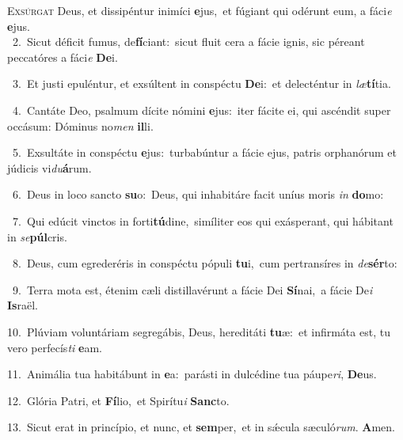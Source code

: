 \lettrine{\initial\textcolor{\initialcolor}{E}}{xsúrgat} Deus, et dissipéntur inimíci \textbf{e}\-jus,~\star et fúgiant qui odérunt eum, a fáci\textit{e} \textbf{e}\-jus.\\
{\numbfont\textcolor{\numbcolor}{~2.}}~Sicut déficit fumus, de\-\textbf{fí}\-ciant:~\star sicut fluit cera a fácie ignis, sic péreant peccatóres a fáci\textit{e} \textbf{De}\-i.\par
{\numbfont\textcolor{\numbcolor}{~3.}}~Et justi epuléntur, et exsúltent in conspéctu \textbf{De}\-i:~\star et delecténtur in \textit{læ}\-\textbf{tí}tia.\par
{\numbfont\textcolor{\numbcolor}{~4.}}~Cantáte Deo, psalmum dícite nómini \textbf{e}\-jus:~\star iter fácite ei, qui ascéndit super occásum: Dóminus no\textit{men} \textbf{il}\-li.\par
{\numbfont\textcolor{\numbcolor}{~5.}}~Exsultáte in conspéctu \textbf{e}\-jus:~\star turbabúntur a fácie ejus, patris orphanórum et júdicis vi\-\textit{du}\-\textbf{á}rum.\par
{\numbfont\textcolor{\numbcolor}{~6.}}~Deus in loco sancto \textbf{su}\-o:~\star Deus, qui inhabitáre facit uníus moris \textit{in} \textbf{do}\-mo:\par
{\numbfont\textcolor{\numbcolor}{~7.}}~Qui edúcit vinctos in forti\-\textbf{tú}\-dine,~\star simíliter eos qui exásperant, qui hábitant in \textit{se}\-\textbf{púl}cris.\par
{\numbfont\textcolor{\numbcolor}{~8.}}~Deus, cum egrederéris in conspéctu pópuli \textbf{tu}\-i,~\star cum pertransíres in \textit{de}\-\textbf{sér}to:\par
{\numbfont\textcolor{\numbcolor}{~9.}}~Terra mota est, étenim cæli distillavérunt a fácie Dei \textbf{Sí}\-nai,~\star a fácie De\textit{i} \textbf{Is}\-raël.\par
{\numbfont\textcolor{\numbcolor}{10.}}~Plúviam voluntáriam segregábis, Deus, hereditáti \textbf{tu}\-æ:~\star et infirmáta est, tu vero perfecís\textit{ti} \textbf{e}\-am.\par
{\numbfont\textcolor{\numbcolor}{11.}}~Animália tua habitábunt in \textbf{e}\-a:~\star parásti in dulcédine tua páupe\-\textit{ri}\-, \textbf{De}\-us.\par
{\numbfont\textcolor{\numbcolor}{12.}}~Glória Patri, et \textbf{Fí}\-lio,~\star et Spirítu\textit{i} \textbf{Sanc}\-to.\par
{\numbfont\textcolor{\numbcolor}{13.}}~Sicut erat in princípio, et nunc, et \textbf{sem}\-per,~\star et in sǽcula sæculó\-\textit{rum}\-. \textbf{A}\-men.\par
